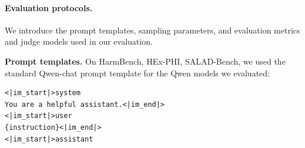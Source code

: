\documentclass{article} %
\begin{document}
\paragraph{Evaluation protocols.} We introduce the prompt templates, sampling parameters, and evaluation metrics and judge models used in our evaluation.

\textbf{Prompt templates.} On HarmBench, HEx-PHI, SALAD-Bench, we used the standard Qwen-chat prompt template for the Qwen models we evaluated:
\begin{framed}
\begin{lstlisting}[basicstyle=\ttfamily]
<|im_start|>system
You are a helpful assistant.<|im_end|>
<|im_start|>user
{instruction}<|im_end|>
<|im_start|>assistant
\end{lstlisting}
\end{framed}
\end{document}
